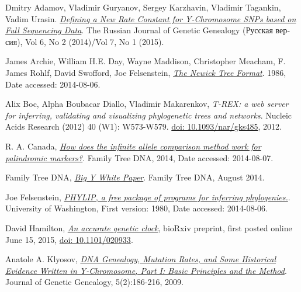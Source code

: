 \raggedright
\begin{thebibliography}{bla}

 Dmitry Adamov, Vladimir Guryanov,
Sergey Karzhavin, Vladimir Tagankin, Vadim Urasin.
\emph{\href{http://rjgg.molgen.org/index.php/RJGGRE/article/view/151}
{Defining a New Rate Constant for Y-Chromosome SNPs based on Full Sequencing Data}}.
The Russian Journal of Genetic Genealogy
(\foreignlanguage{russian}{Русская версия}),
Vol 6, No 2 (2014)/Vol 7, No 1 (2015).

 James Archie, William H.E. Day, Wayne Maddison,
Christopher Meacham, F. James Rohlf, David Swofford, Joe Felsenstein,
\emph{\href{http://evolution.genetics.washington.edu/phylip/newicktree.html}
{The Newick Tree Format}}.
1986, Date accessed: 2014-08-06.

 Alix Boc, Alpha Boubacar Diallo, Vladimir Makarenkov,
\emph{T-REX: a web server for inferring, validating and
visualizing phylogenetic trees and networks}.
Nucleic Acids Research (2012) 40 (W1): W573-W579.
\href{http://dx.doi.org/10.1093/nar/gks485}{doi: 10.1093/nar/gks485}, 2012. 

 R. A. Canada,
\emph{\href{https://www.familytreedna.com/learn/y-dna-testing/y-str/infinite-allele-palindromic-markers/}
{How does the infinite allele comparison method work for palindromic markers?}}.
Family Tree DNA, 2014, Date accessed: 2014-08-07.

 Family Tree DNA,
\emph{\href{https://www.familytreedna.com/learn/wp-content/uploads/2014/08/BIG_Y_WhitePager.pdf}{Big Y White Paper}}.
Family Tree DNA, August 2014.

 Joe Felsenstein,
\emph{\href{http://evolution.genetics.washington.edu/phylip.html}
{PHYLIP, a free package of programs for inferring phylogenies.}}.
University of Washington, First version: 1980, Date accessed: 2014-08-06.

 David Hamilton,
\emph{\href{http://biorxiv.org/content/early/2015/06/19/020933}
{An accurate genetic clock}},
bioRxiv preprint, first posted online June 15, 2015,
\href{http://dx.doi.org/10.1101/020933}{doi: 10.1101/020933}.

 Anatole A. Klyosov,
\emph{\href{http://www.jogg.info/52/files/Klyosov1.pdf}
{DNA Genealogy, Mutation Rates, and Some Historical
Evidence Written in Y-Chromosome, Part I:  Basic Principles and
the Method}}.
Journal of Genetic Genealogy, 5(2):186-216, 2009.


\end{thebibliography}
